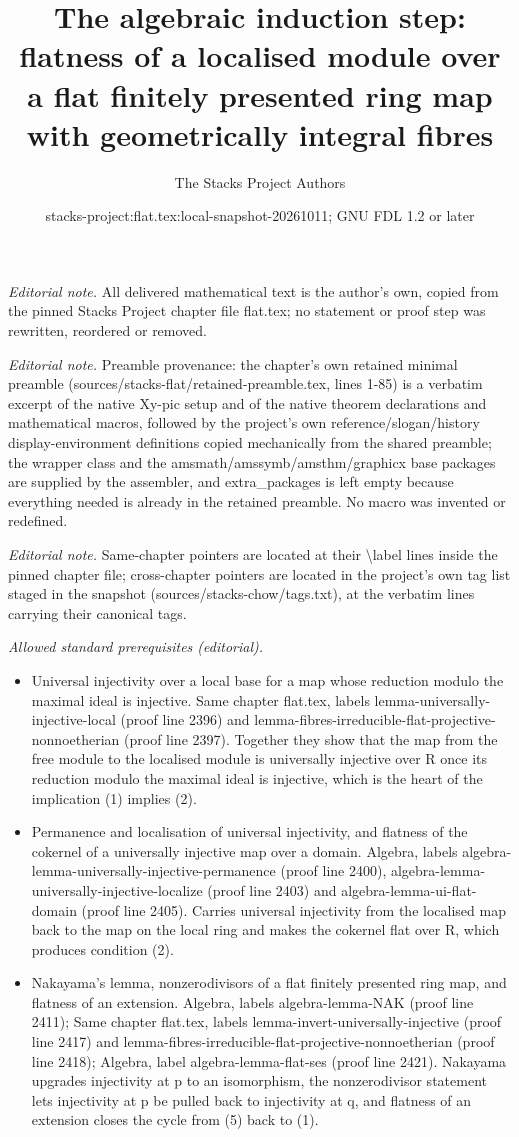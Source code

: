 \documentclass[10pt,a4paper]{amsart}
\title{The algebraic induction step: flatness of a localised module over a flat finitely presented ring map with geometrically integral fibres}
\author{The Stacks Project Authors}
\date{stacks-project:flat.tex:local-snapshot-20261011; GNU FDL 1.2 or later}
\theoremstyle{plain}
\theoremstyle{definition}
\theoremstyle{remark}
\numberwithin{equation}{subsection}
\begin{document}
\maketitle
\noindent\textit{Editorial note.} All delivered mathematical text is the author's own, copied from the pinned Stacks Project chapter file flat.tex; no statement or proof step was rewritten, reordered or removed.\par\medskip
\noindent\textit{Editorial note.} Preamble provenance: the chapter's own retained minimal preamble (sources/stacks-flat/retained-preamble.tex, lines 1-85) is a verbatim excerpt of the native Xy-pic setup and of the native theorem declarations and mathematical macros, followed by the project's own reference/slogan/history display-environment definitions copied mechanically from the shared preamble; the wrapper class and the amsmath/amssymb/amsthm/graphicx base packages are supplied by the assembler, and extra\_packages is left empty because everything needed is already in the retained preamble. No macro was invented or redefined.\par\medskip
\noindent\textit{Editorial note.} Same-chapter pointers are located at their \textbackslash{}label lines inside the pinned chapter file; cross-chapter pointers are located in the project's own tag list staged in the snapshot (sources/stacks-chow/tags.txt), at the verbatim lines carrying their canonical tags.\par\medskip
\noindent\textit{Allowed standard prerequisites (editorial).}\begin{itemize}
\item Universal injectivity over a local base for a map whose reduction modulo the maximal ideal is injective. Same chapter flat.tex, labels lemma-universally-injective-local (proof line 2396) and lemma-fibres-irreducible-flat-projective-nonnoetherian (proof line 2397). Together they show that the map from the free module to the localised module is universally injective over R once its reduction modulo the maximal ideal is injective, which is the heart of the implication (1) implies (2).
\item Permanence and localisation of universal injectivity, and flatness of the cokernel of a universally injective map over a domain. Algebra, labels algebra-lemma-universally-injective-permanence (proof line 2400), algebra-lemma-universally-injective-localize (proof line 2403) and algebra-lemma-ui-flat-domain (proof line 2405). Carries universal injectivity from the localised map back to the map on the local ring and makes the cokernel flat over R, which produces condition (2).
\item Nakayama's lemma, nonzerodivisors of a flat finitely presented ring map, and flatness of an extension. Algebra, labels algebra-lemma-NAK (proof line 2411); Same chapter flat.tex, labels lemma-invert-universally-injective (proof line 2417) and lemma-fibres-irreducible-flat-projective-nonnoetherian (proof line 2418); Algebra, label algebra-lemma-flat-ses (proof line 2421). Nakayama upgrades injectivity at p to an isomorphism, the nonzerodivisor statement lets injectivity at p be pulled back to injectivity at q, and flatness of an extension closes the cycle from (5) back to (1).
\end{itemize}\medskip
\end{document}
